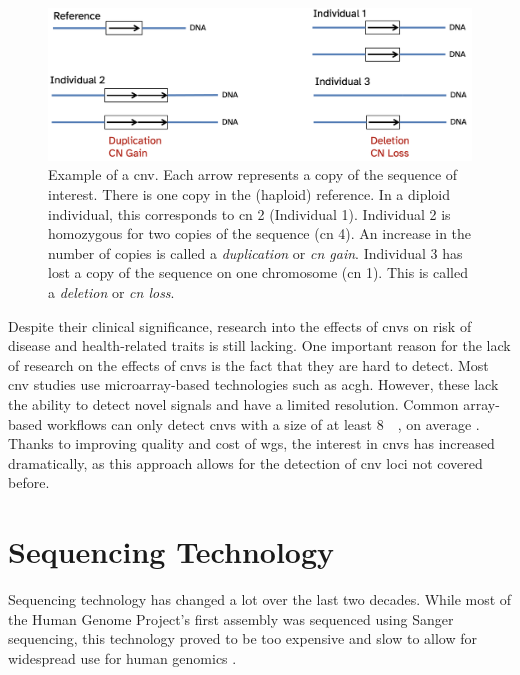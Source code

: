 \documentclass[twoside=false]{scrbook}
\begin{document}
\begin{figure}
    \centering
    \includegraphics[width=\textwidth]{img/cnv_example.png}
    \caption{Example of a \gls{cnv}.
        Each arrow represents a copy of the sequence of interest.
        There is one copy in the (haploid) reference.
        In a diploid individual, this corresponds to \gls{cn} 2 (Individual 1).
        Individual 2 is homozygous for two copies of the sequence (\gls{cn} 4).
        An increase in the number of copies is called a \textit{duplication} or \textit{\gls{cn} gain}.
        Individual 3 has lost a copy of the sequence on one chromosome (\gls{cn} 1).
        This is called a \textit{deletion} or \textit{\gls{cn} loss}.}
        \label{fig:cnv}
\end{figure}

Despite their clinical significance, research into the effects of \glspl{cnv} on risk of disease and health-related traits is still lacking.
One important reason for the lack of research on the effects of \glspl{cnv} is the fact that they are hard to detect.
Most \gls{cnv} studies use microarray-based technologies such as \gls{acgh}.
However, these lack the ability to detect novel signals and have a limited resolution.
Common array-based workflows can only detect \glspl{cnv} with a size of at least \qty{8}{\kilo\base}, on average \cite{Quenez2020}.
Thanks to improving quality and cost of \gls{wgs}, the interest in \glspl{cnv} has increased dramatically, as this approach allows for the detection of \gls{cnv} loci not covered before.

\section{Sequencing Technology}
Sequencing technology has changed a lot over the last two decades.
While most of the Human Genome Project's first assembly was sequenced using Sanger sequencing, this technology proved to be too expensive and slow to allow for widespread use for human genomics \cite{Lander2001}.
\end{document}
